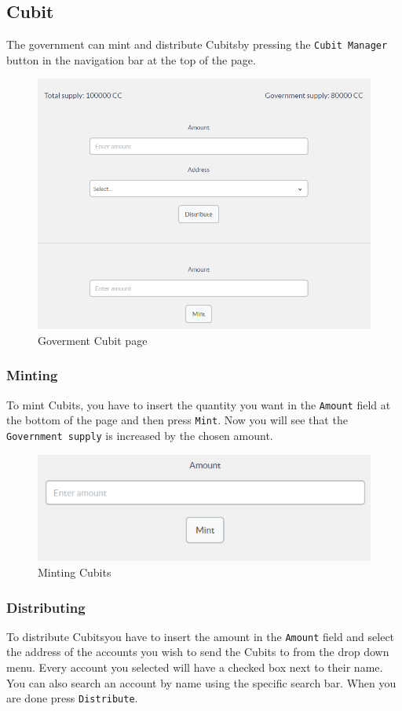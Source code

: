 	\subsection{Cubit}
	The government can mint and distribute Cubits\glosp by pressing the \texttt{Cubit 
	Manager} button in the navigation bar at the top of the page.
	\begin{figure}[H]
		\includegraphics[width=15cm]{res/images/cubit_manager.png}
		\centering
		\caption{Goverment Cubit page}
	\end{figure}
		\subsubsection{Minting}
		To mint Cubits\glo{}, you have to insert the quantity you want in the 
		\texttt{Amount} field at the bottom of the page and then press \texttt{Mint}. Now you will 
		see that the \texttt{Government supply} is increased by the chosen amount.
		\begin{figure}[H]
			\includegraphics[width=15cm]{res/images/minting_cubits.png}
			\centering
			\caption{Minting Cubits}
		\end{figure}
		\subsubsection{Distributing}
		To distribute Cubits\glosp you have to insert the amount in the \texttt{Amount} 
		field and select the address of the accounts you wish to send the Cubits to 
		from the drop down menu. Every account you selected will have a checked 
		box next to their name. You can also search an account by name using the 
		specific search bar. When you are done press \texttt{Distribute}.\\

